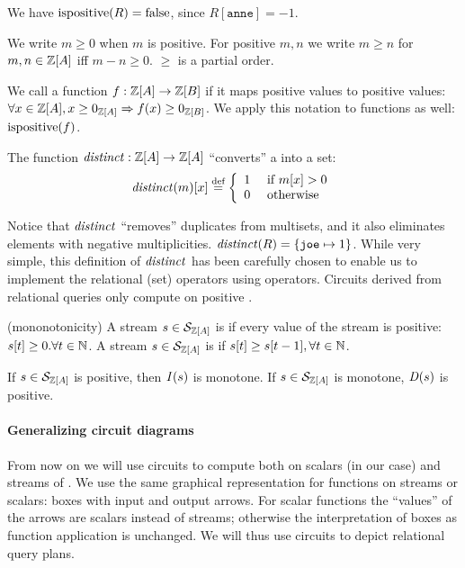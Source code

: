 \ifzsetexamples
We have $\mbox{ispositive}(R) = \mbox{false}$, since $R[\texttt{anne}] = -1$.
\fi

We write $m \geq 0$ when $m$ is
positive.  For positive $m, n$ we write $m \geq n$ for $m, n
\in \mathbb{Z}[A]$ iff $m - n \geq 0$.  $\geq$ is a partial order.

We call a function $f : \mathbb{Z}[A] \rightarrow \mathbb{Z}[B]$  if it maps
positive values to positive values:
$\forall x \in \mathbb{Z}[A], x \geq 0_{\mathbb{Z}[A]} \Rightarrow f(x) \geq 0_{\mathbb{Z}[B]}$.  
We apply this notation to functions as well: $\mbox{ispositive}(f)$.

\begin{definition}[distinct]
The function $\mathit{distinct}: \mathbb{Z}[A] \rightarrow \mathbb{Z}[A]$
``converts'' a \zr into a set:
$$\mathit{distinct}(m)[x] \stackrel{\textrm{\scriptsize def}}{=} \left\{
\begin{array}{ll}
  1 & \mbox{ if } m[x] > 0 \\
  0 & \mbox{ otherwise}
\end{array}
\right.
$$
\end{definition}

Notice that $\mathit{distinct}$ ``removes'' duplicates from multisets, and it also eliminates 
elements with negative multiplicities.
\ifzsetexamples
$\mathit{distinct}(R) = \{ \texttt{joe} \mapsto 1 \}$.
\fi
While very simple, this definition of $\mathit{distinct}$ has been carefully 
chosen to enable us to implement the relational (set) operators
using \zrs operators.
Circuits derived from relational queries only compute on positive \zrs.

\begin{definition}(mononotonicity)
A stream $s \in \mathcal{S}_{\mathbb{Z}[A]}$ is  if every value of the stream is positive:
$s[t] \geq 0 . \forall t \in \mathbb{N}$.
A stream $s \in \mathcal{S}_{\mathbb{Z}[A]}$ is  if $s[t] \geq s[t-1], \forall t \in \mathbb{N}$.
\end{definition}

If $s \in \mathcal{S}_{\mathbb{Z}[A]}$ is positive, then $\mathit{I}(s)$ is monotone.
If $s \in \mathcal{S}_{\mathbb{Z}[A]}$ is monotone, $\mathit{D}(s)$ is positive.

\paragraph{Generalizing circuit diagrams}

From now on we will use circuits to compute both on scalars (\zrs in our case) and streams of \zrs.
We use the same graphical representation for functions on streams or scalars: 
boxes with input and output arrows.  For scalar functions the ``values'' 
of the arrows are scalars instead of streams; otherwise
the interpretation of boxes as function application is unchanged.  We will
thus use circuits to depict relational query plans.

